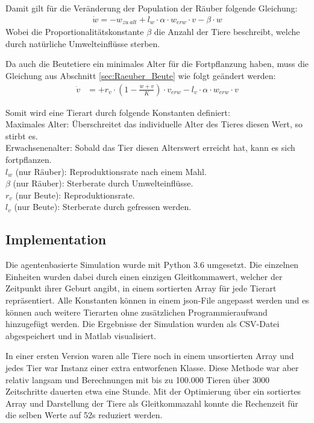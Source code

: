 \documentclass[a4paper,twoside]{article}
\begin{document}
	Damit gilt für die Veränderung der Population der Räuber folgende Gleichung:
	\begin{align*}
		\dot{w} = -w_{zu~alt} + l_w \cdot \alpha \cdot w_{erw} \cdot v - \beta \cdot w
	\end{align*}
	Wobei die Proportionalitätskonstante \(\beta\) die Anzahl der Tiere beschreibt, welche durch natürliche Umwelteinflüsse sterben.

	Da auch die Beutetiere ein minimales Alter für die Fortpflanzung haben, muss die Gleichung aus Abschnitt \ref{sec:Raeuber_Beute} wie folgt geändert werden:
	\begin{align*}
		\dot{v} &= +r_v \cdot \left(1 - \frac{w+v}{K} \right) \cdot v_{erw} - l_v \cdot \alpha \cdot w_{erw} \cdot v
	\end{align*}
	
		Somit wird eine Tierart durch folgende Konstanten definiert:\\
	Maximales Alter: Überschreitet das individuelle Alter des Tieres diesen Wert, so stirbt es.\\
	Erwachsenenalter: Sobald das Tier diesen Alterswert erreicht hat, kann es sich fortpflanzen. \\
	\(l_w\) (nur Räuber): Reproduktionsrate nach einem Mahl.\\
	\(\beta\) (nur Räuber): Sterberate durch Umwelteinflüsse. \\
	\(r_v\) (nur Beute): Reproduktionsrate. \\
	\(l_v\) (nur Beute): Sterberate durch gefressen werden. \\

	\subsection{Implementation}
	Die agentenbasierte Simulation wurde mit Python 3.6 umgesetzt. Die einzelnen Einheiten wurden dabei durch einen einzigen Gleitkommawert, welcher der Zeitpunkt ihrer Geburt angibt, in einem sortierten Array für jede Tierart repräsentiert. Alle Konstanten können in einem json-File angepasst werden und es können auch weitere Tierarten ohne zusätzlichen Programmieraufwand hinzugefügt werden. Die Ergebnisse der Simulation wurden als CSV-Datei abgespeichert und in Matlab visualisiert.
	
	In einer ersten Version waren alle Tiere noch in einem unsortierten Array und jedes Tier war Instanz einer extra entworfenen Klasse. Diese Methode war aber relativ langsam und  Berechnungen mit bis zu 100.000 Tieren über 3000 Zeitschritte dauerten etwa eine Stunde. Mit der Optimierung über ein sortiertes Array und Darstellung der Tiere als Gleitkommazahl konnte die Rechenzeit für die selben Werte auf 52s reduziert werden.
	
\end{document}

